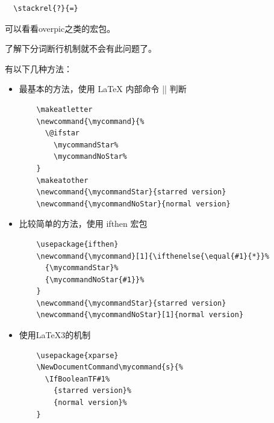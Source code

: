 
\begin{verbatim}
  \stackrel{?}{=}
\end{verbatim}



可以看看overpic之类的宏包。



了解下分词断行机制就不会有此问题了。













有以下几种方法：
\begin{itemize}
  \item 最基本的方法，使用 \LaTeX{} 内部命令 |\@ifstar| 判断
  \begin{verbatim}
    \makeatletter
    \newcommand{\mycommand}{%
      \@ifstar
        \mycommandStar%
        \mycommandNoStar%
    }
    \makeatother
    \newcommand{\mycommandStar}{starred version}
    \newcommand{\mycommandNoStar}{normal version}
  \end{verbatim}
  \item 比较简单的方法，使用 ifthen 宏包
  \begin{verbatim}
    \usepackage{ifthen}
    \newcommand{\mycommand}[1]{\ifthenelse{\equal{#1}{*}}%
      {\mycommandStar}%
      {\mycommandNoStar{#1}}%
    }
    \newcommand{\mycommandStar}{starred version}
    \newcommand{\mycommandNoStar}[1]{normal version}  
  \end{verbatim}
  \item 使用\LaTeX{3}的机制
  \begin{verbatim}
    \usepackage{xparse}
    \NewDocumentCommand\mycommand{s}{%
      \IfBooleanTF#1%
        {starred version}%
        {normal version}%
    }
  \end{verbatim}
\end{itemize}


